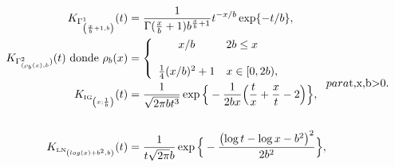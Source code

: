 
\begin{subequations}
	\label{NucleosAsimetricosUsados}
	\begin{align}
	K_{\tiny \Gamma^1_{\left(\frac{x}{b}+1,b\right)}}(t) & =\frac{1}{\Gamma(\frac{x}{b}+1)b^{\frac{x}{b}+1}} t^{-{x}/{b}} \exp\{-{t}/{b}\},
	\label{gammakernel}\\
	K_{\tiny \Gamma^2_{({\rho}_b(x),b})}(t) \text{ donde }
	\rho_b (x)&= \left\{
	\begin{array}{c l}
	x/b & 2 b \leq  x \\
	\\
	\frac{1}{4}(x/b)^2+1 & x \in [0,2 b),\\
	\end{array}
	\right.
	\label{gammakernel2}\\
	K_{\text{\tiny IG}_{\left( x;\frac{1}{b}\right)}}(t) & =\frac{1}{\sqrt{2\pi b t^3}} 
	\exp\Big\{-\frac{1}{2b x} \Big(\frac{t}{x}+\frac{x}{t}-2\Big)\Big\},
	\label{IGkernel}\\
	\label{RIGkernel}\\
	K_{{\text{\tiny LN}}_{\left(log(x)+b^2,b \right)}}(t) & =\frac{1}{t \sqrt{2 \pi} b} \exp\Big\{-\frac{\left(\log t - \log x -b^2\right)^2}{2b^2}\Big\},
	\label{LNkernel}
	\end{align}
	para $t,x,b>0$.
\end{subequations}

